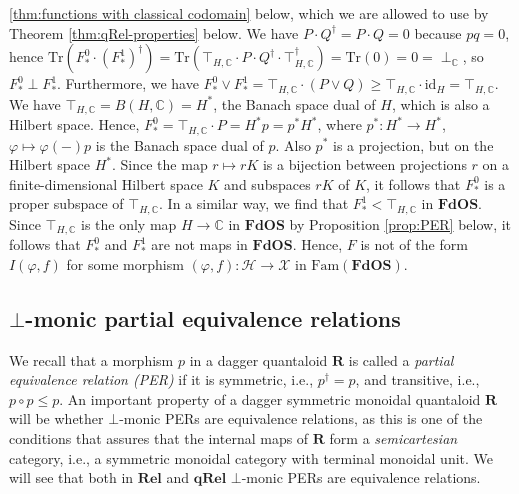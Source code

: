 \documentclass[12pt]{tac}
\theoremstyle{definition}
\theoremstyle{remark}
\renewcommand{\H}{\mathcal H}
\newcommand{\X}{\mathcal X}
\newcommand{\CC}{\mathbb C}
\newcommand{\<}{\langle}
\renewcommand{\>}{\rangle}
\renewcommand{\:}{\colon}
\newcommand{\id}{\mathrm{id}}
\begin{document}
\ref{thm:functions with classical codomain} below, which we are allowed to use by Theorem \ref{thm:qRel-properties} below. We have $P\cdot Q^\dag=P\cdot Q=0$ because $pq=0$, hence $\mathrm{Tr}(F_*^0\cdot (F_*^1)^\dag)=\mathrm{Tr}(\top_{H,\CC}\cdot P\cdot Q^\dag\cdot \top_{H,\CC}^\dag)=\mathrm{Tr}(0)=0=\perp_\CC$, so $F_*^0\perp F_*^1$. Furthermore, we have $F_*^0\vee F_*^1=\top_{H,\CC}\cdot (P\vee Q)\geq \top_{H,\CC}\cdot\id_H=\top_{H,\CC}$. We have $\top_{H,\CC}=B(H,\CC)=H^*$, the Banach space dual of $H$, which is also a Hilbert space. Hence, $F_*^0=\top_{H,\CC}\cdot P=H^*p=p^*H^*$, where $p^*:H^*\to H^*$, $\varphi\mapsto \varphi(-)p$ is the Banach space dual of $p$. Also $p^*$ is a projection, but on the Hilbert space $H^*$. Since the map $r\mapsto rK$ is a bijection between projections $r$ on a finite-dimensional Hilbert space $K$ and subspaces $rK$ of $K$, it follows that $F_*^0$ is a proper subspace of $\top_{H,\CC}$. In a similar way, we find that $F_*^1<\top_{H,\CC}$ in $\mathbf{FdOS}$. Since $\top_{H,\CC}$ is the only map $H\to\CC$ in $\mathbf{FdOS}$ by  Proposition \ref{prop:PER} below, it follows that $F_*^0$ and $F_*^1$ are not maps in $\mathbf{FdOS}$. Hence, $F$ is not of the form $I(\varphi,f)$ for some morphism $(\varphi,f):\H\to\X$ in $\mathrm{Fam}(\mathbf{FdOS})$. 

\subsection{$\bot$-monic partial equivalence relations}
We recall that a morphism $p$ in a dagger quantaloid $\mathbf R$ is called a \emph{partial equivalence relation (PER)} if it is symmetric, i.e., $p^\dag=p$, and transitive, i.e., $p\circ p\leq p$. An important property of a dagger symmetric monoidal quantaloid $\mathbf R$ will be whether $\bot$-monic PERs are equivalence relations, as this is one of the conditions that assures that the internal maps of $\mathbf R$ form a \emph{semicartesian} category, i.e., a symmetric monoidal category with terminal monoidal unit. We will see that both in $\mathbf{Rel}$ and $\mathbf{qRel}$ $\bot$-monic PERs are equivalence relations. 
\end{document}
